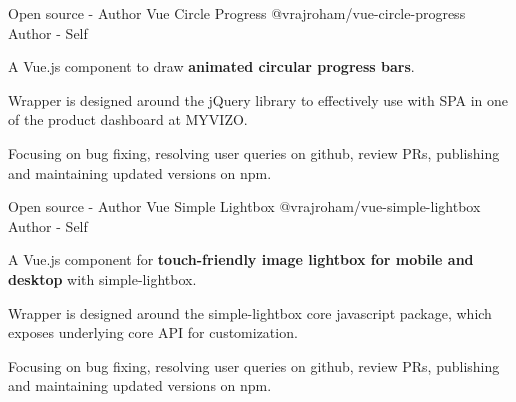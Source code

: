\begin{cventries}
  \cventry
    {Open source - Author} %
    {Vue Circle Progress} %
    {@vrajroham/vue-circle-progress} %
    {Author - Self} %
    {
      \begin{cvitems} %
        \item{A Vue.js component to draw \textbf{animated circular progress bars}.}
        \item{Wrapper is designed around the jQuery library to effectively use with SPA in one of the product dashboard at MYVIZO.}
        \item {Focusing on bug fixing, resolving user queries on github, review PRs, publishing and maintaining updated versions on npm.}
      \end{cvitems}
    }

  \cventry
    {Open source - Author} %
    {Vue Simple Lightbox} %
    {@vrajroham/vue-simple-lightbox} %
    {Author - Self} %
    {
      \begin{cvitems} %
        \item {A Vue.js component for \textbf{touch-friendly image lightbox for mobile and desktop} with simple-lightbox.}
        \item {Wrapper is designed around the simple-lightbox core javascript package, which exposes underlying core API for customization.}
        \item {Focusing on bug fixing, resolving user queries on github, review PRs, publishing and maintaining updated versions on npm.}
      \end{cvitems}
    }
\end{cventries}
